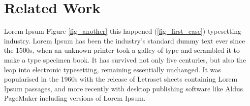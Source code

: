 \section{Related Work}

\begin{figure*}[!t]
\centerline{\subfloat[Case I]\texttt{[image: images/picutre.png]}%
\label{fig_first_case}}
\hfil
{}}
\caption{Subfig results}
\label{fig_another}
\end{figure*}

Lorem Ipsum Figure \ref{fig_another} this happened (\ref{fig_first_case}) typesetting industry. Lorem Ipsum has been the industry's standard dummy text ever since the 1500s, when an unknown printer took a galley of type and scrambled it to make a type specimen book. It has survived not only five centuries, but also the leap into electronic typesetting, remaining essentially unchanged. It was popularised in the 1960s with the release of Letraset sheets containing Lorem Ipsum passages, and more recently with desktop publishing software like Aldus PageMaker including versions of Lorem Ipsum.